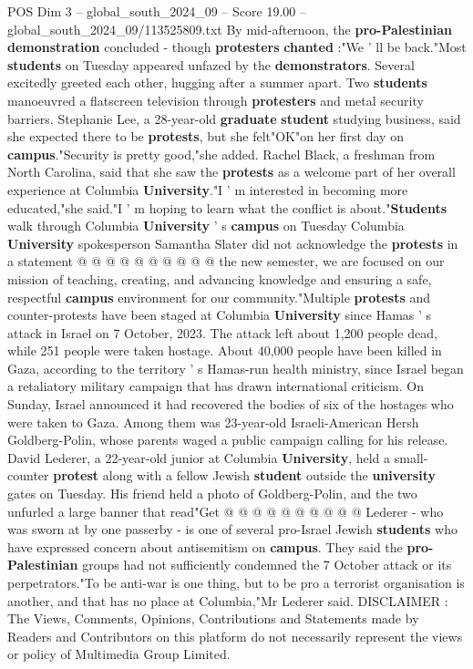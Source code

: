 \begin{textsample}{POS Dim 3 – global\_south\_2024\_09 – Score 19.00 – global\_south\_2024\_09/113525809.txt}
By mid-afternoon, the \textbf{pro-Palestinian} \textbf{demonstration} concluded - though \textbf{protesters} \textbf{chanted} :"We ' ll be back."Most \textbf{students} on Tuesday appeared unfazed by the \textbf{demonstrators}.
Several excitedly greeted each other, hugging after a summer apart.
Two \textbf{students} manoeuvred a flatscreen television through \textbf{protesters} and metal security barriers.
Stephanie Lee, a 28-year-old \textbf{graduate} \textbf{student} studying business, said she expected there to be \textbf{protests}, but she felt"OK"on her first day on \textbf{campus}."Security is pretty good,"she added.
Rachel Black, a freshman from North Carolina, said that she saw the \textbf{protests} as a welcome part of her overall experience at Columbia \textbf{University}."I ' m interested in becoming more educated,"she said."I ' m hoping to learn what the conflict is about."\textbf{Students} walk through Columbia \textbf{University} ' s \textbf{campus} on Tuesday Columbia \textbf{University} spokesperson Samantha Slater did not acknowledge the \textbf{protests} in a statement @ @ @ @ @ @ @ @ @ @ the new semester, we are focused on our mission of teaching, creating, and advancing knowledge and ensuring a safe, respectful \textbf{campus} environment for our community."Multiple \textbf{protests} and counter-protests have been staged at Columbia \textbf{University} since Hamas ' s attack in Israel on 7 October, 2023.
The attack left about 1,200 people dead, while 251 people were taken hostage.
About 40,000 people have been killed in Gaza, according to the territory ' s Hamas-run health ministry, since Israel began a retaliatory military campaign that has drawn international criticism.
On Sunday, Israel announced it had recovered the bodies of six of the hostages who were taken to Gaza.
Among them was 23-year-old Israeli-American Hersh Goldberg-Polin, whose parents waged a public campaign calling for his release.
David Lederer, a 22-year-old junior at Columbia \textbf{University}, held a small-counter \textbf{protest} along with a fellow Jewish \textbf{student} outside the \textbf{university} gates on Tuesday.
His friend held a photo of Goldberg-Polin, and the two unfurled a large banner that read"Get @ @ @ @ @ @ @ @ @ @ Lederer - who was sworn at by one passerby - is one of several pro-Israel Jewish \textbf{students} who have expressed concern about antisemitism on \textbf{campus}.
They said the \textbf{pro-Palestinian} groups had not sufficiently condemned the 7 October attack or its perpetrators."To be anti-war is one thing, but to be pro a terrorist organisation is another, and that has no place at Columbia,"Mr Lederer said.
DISCLAIMER : The Views, Comments, Opinions, Contributions and Statements made by Readers and Contributors on this platform do not necessarily represent the views or policy of Multimedia Group Limited.

\end{textsample}
